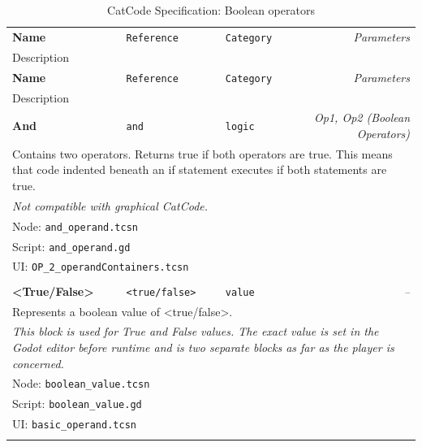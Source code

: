 \begin{center}
  \begin{longtable}{lllr}
    \caption{CatCode Specification: Boolean operators} \label{tab:catCodeSpec/op} \\
    \toprule
    \textbf{Name}
    & \texttt{Reference}
    & \texttt{Category}
    & \textit{Parameters} \\
    \multicolumn{4}{l}{
        Description
    }
    \\\midrule
    \endfirsthead
    \toprule
    \textbf{Name}
    & \texttt{Reference}
    & \texttt{Category}
    & \textit{Parameters} \\
    \multicolumn{4}{l}{
        Description
    }
    \\\midrule
    \endhead
    
    \textbf{And}
    & \texttt{and}
    & \texttt{logic}
    & \textit{Op1, Op2 (Boolean Operators)}
    \\
    \multicolumn{4}{p{0.98\linewidth}}{
        Contains two operators.
        Returns true if both operators are true.
        This means that code indented beneath an if statement executes if both statements are true.
    }
    \\
    \multicolumn{4}{p{0.98\linewidth}}{
        \textit{Not compatible with graphical CatCode.}
    }
    \\ \multicolumn{4}{l}{Node: \texttt{and\_operand.tcsn}}
    \\ \multicolumn{4}{l}{Script: \texttt{and\_operand.gd}}
    \\ \multicolumn{4}{l}{UI: \texttt{OP\_2\_operandContainers.tcsn}}
    \\ \\

    \textbf{<True/False>}
    & \texttt{<true/false>}
    & \texttt{value}
    & \textit{--}
    \\
    \multicolumn{4}{p{0.98\linewidth}}{
        Represents a boolean value of <true/false>.
    }
    \\
    \multicolumn{4}{p{0.98\linewidth}}{
        \textit{This block is used for True and False values. The exact value is set in the Godot editor before runtime and is two separate blocks as far as the player is concerned.}
    }
    \\ \multicolumn{4}{l}{Node: \texttt{boolean\_value.tcsn}}
    \\ \multicolumn{4}{l}{Script: \texttt{boolean\_value.gd}}
    \\ \multicolumn{4}{l}{UI: \texttt{basic\_operand.tcsn}}
    \\ \\


\end{longtable}
\end{center}
